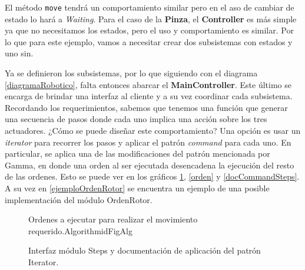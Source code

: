 El método \verb|move| tendrá un comportamiento similar pero en el aso de cambiar de estado lo hará a \textit{Waiting}. Para el caso de la \textbf{Pinza}, el \textbf{Controller} es más simple ya que no necesitamos los estados, pero el uso y comportamiento es similar. Por lo que para este ejemplo, vamos a necesitar crear dos subsistemas con estados y uno sin.

Ya se definieron los subsistemas, por lo que siguiendo con el diagrama \ref{diagramaRobotico}, falta entonces abarcar el \textbf{MainController}. Este último se encarga de brindar una interfaz al cliente y a su vez coordinar cada subsistema. Recordando los requerimientos, sabemos que tenemos una función que generar una secuencia de pasos donde cada uno implica una acción sobre los tres actuadores. ¿Cómo se puede diseñar este comportamiento? Una opción es usar un \textit{iterator} para recorrer los pasos y aplicar el patrón \textit{command} para cada uno. En particular, se aplica una de las modificaciones del patrón mencionada por Gamma\cite{Gamma:1995:DPE:186897}, en donde una orden al ser ejecutada desencadena la ejecución del resto de las ordenes. Esto se puede ver en los gráficos \ref{iterator}, \ref{orden} y \ref{docCommandSteps}. A su vez en \ref{ejemploOrdenRotor} se encuentra un ejemplo de una posible implementación del módulo OrdenRotor.

\begin{figure}[h]
\caption{Interfaz módulo Steps y documentación de aplicación del patrón Iterator.}
\label{iterator}
\begin{center}
\end{center}
\begin{pattern}[]{Ordenes a ejecutar para realizar el movimiento requerido.}{Algorithm}{idFigAlg}
\assigns
{}

\end{pattern}
\end{figure}

